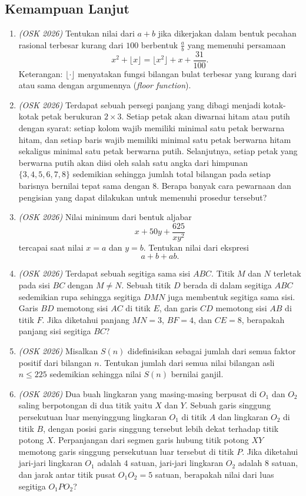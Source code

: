\documentclass[11pt]{scrartcl}
\begin{document}
\subsection{Kemampuan Lanjut}
\begin{enumerate}
\item \textit{(OSK 2026)} Tentukan nilai dari $a+b$ jika dikerjakan dalam bentuk pecahan rasional terbesar kurang dari $100$ berbentuk $\frac{a}{b}$ yang memenuhi persamaan
\[
x^2+\lfloor x\rfloor=\lfloor x^2\rfloor+x+\frac{31}{100}.
\]
Keterangan: $\lfloor\cdot\rfloor$ menyatakan fungsi bilangan bulat terbesar yang kurang dari atau sama dengan argumennya (\emph{floor function}).

\item \textit{(OSK 2026)} Terdapat sebuah persegi panjang yang dibagi menjadi kotak-kotak petak berukuran $2\times3$. Setiap petak akan diwarnai hitam atau putih dengan syarat: setiap kolom wajib memiliki minimal satu petak berwarna hitam, dan setiap baris wajib memiliki minimal satu petak berwarna hitam sekaligus minimal satu petak berwarna putih. Selanjutnya, setiap petak yang berwarna putih akan diisi oleh salah satu angka dari himpunan $\{3,4,5,6,7,8\}$ sedemikian sehingga jumlah total bilangan pada setiap barisnya bernilai tepat sama dengan $8$. Berapa banyak cara pewarnaan dan pengisian yang dapat dilakukan untuk memenuhi prosedur tersebut?

\item \textit{(OSK 2026)} Nilai minimum dari bentuk aljabar
\[
x+50y+\frac{625}{xy^2}
\]
tercapai saat nilai $x=a$ dan $y=b$. Tentukan nilai dari ekspresi
\[
a+b+ab.
\]

\item \textit{(OSK 2026)} Terdapat sebuah segitiga sama sisi $ABC$. Titik $M$ dan $N$ terletak pada sisi $BC$ dengan $M\neq N$. Sebuah titik $D$ berada di dalam segitiga $ABC$ sedemikian rupa sehingga segitiga $DMN$ juga membentuk segitiga sama sisi. Garis $BD$ memotong sisi $AC$ di titik $E$, dan garis $CD$ memotong sisi $AB$ di titik $F$. Jika diketahui panjang $MN=3$, $BF=4$, dan $CE=8$, berapakah panjang sisi segitiga $BC$?

\item \textit{(OSK 2026)} Misalkan $S(n)$ didefinisikan sebagai jumlah dari semua faktor positif dari bilangan $n$. Tentukan jumlah dari semua nilai bilangan asli $n\le225$ sedemikian sehingga nilai $S(n)$ bernilai ganjil.

\item \textit{(OSK 2026)} Dua buah lingkaran yang masing-masing berpusat di $O_1$ dan $O_2$ saling berpotongan di dua titik yaitu $X$ dan $Y$. Sebuah garis singgung persekutuan luar menyinggung lingkaran $O_1$ di titik $A$ dan lingkaran $O_2$ di titik $B$, dengan posisi garis singgung tersebut lebih dekat terhadap titik potong $X$. Perpanjangan dari segmen garis hubung titik potong $XY$ memotong garis singgung persekutuan luar tersebut di titik $P$. Jika diketahui jari-jari lingkaran $O_1$ adalah $4$ satuan, jari-jari lingkaran $O_2$ adalah $8$ satuan, dan jarak antar titik pusat $O_1O_2=5$ satuan, berapakah nilai dari luas segitiga $O_1PO_2$?


\end{enumerate}
\end{document}

